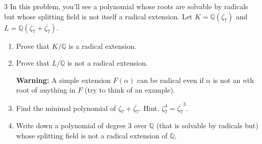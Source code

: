 \documentclass[12pt]{article}
\begin{document}
\begin{problem}{3}
    In this problem, you'll see a polynomial whose roots are solvable by radicals but whose splitting field is not itself a radical extension. Let $K = \mathbb{Q}(\zeta_7)$ and $L = \mathbb{Q}(\zeta_7 + \overline{\zeta_7})$.

    \begin{enumerate}
        \item[(a)] Prove that $K/\mathbb{Q}$ is a radical extension.

        \item[(b)] Prove that $L/\mathbb{Q}$ is not a radical extension. 
        
        \textbf{Warning:} A simple extension $F(\alpha)$ can be radical even if $\alpha$ is not an $n$th root of anything in $F$ (try to think of an example).

        \item[(c)] Find the minimal polynomial of $\zeta_7 + \overline{\zeta_7}$. Hint. $\zeta_7^4 = \overline{\zeta_7}^3$.

        \item[(d)] Write down a polynomial of degree 3 over $\mathbb{Q}$ (that is solvable by radicals but) whose splitting field is not a radical extension of $\mathbb{Q}$.
    \end{enumerate}
\end{problem}
\end{document}
